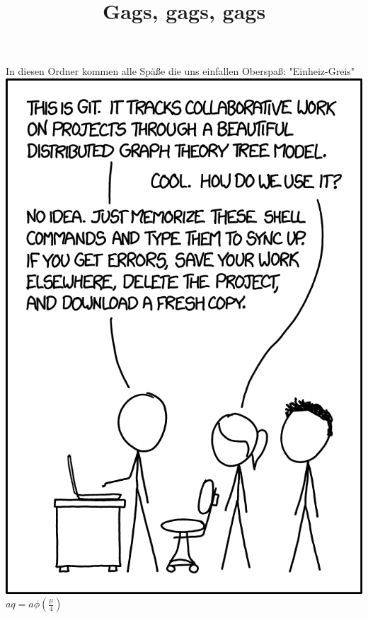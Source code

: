 ﻿\documentclass{article}
\title{Gags, gags, gags}
\begin{document}
\maketitle

In diesen Ordner kommen alle Späße die uns einfallen
Oberspaß: "Einheiz-Greis"
\includegraphics[width=0.5\linewidth]{git_2x.png}
$aq=a\phi\left(\frac{\mu}{4}\right)$
\end{document}
